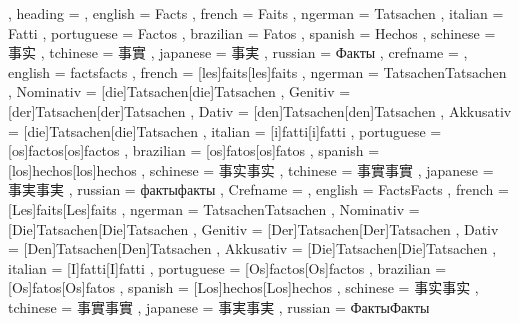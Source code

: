   {
    , heading =   {
                    , english     = Facts
                    , french      = Faits
                    , ngerman     = Tatsachen
                    , italian     = Fatti
                    , portuguese  = Factos
                    , brazilian   = Fatos
                    , spanish     = Hechos
                    , schinese    = 事实
                    , tchinese    = 事實
                    , japanese    = 事実
                    , russian     = Факты
                  }
    , crefname =  {
                    , english     = {facts}{facts}
                    , french      = [les]{faits}[les]{faits}
                    , ngerman     = { {Tatsachen}{Tatsachen}
                                      , Nominativ = [die]{Tatsachen}[die]{Tatsachen}
                                      , Genitiv   = [der]{Tatsachen}[der]{Tatsachen}
                                      , Dativ     = [den]{Tatsachen}[den]{Tatsachen}
                                      , Akkusativ = [die]{Tatsachen}[die]{Tatsachen}
                                    }
                    , italian     = [i]{fatti}[i]{fatti}
                    , portuguese  = [os]{factos}[os]{factos}
                    , brazilian   = [os]{fatos}[os]{fatos}
                    , spanish     = [los]{hechos}[los]{hechos}
                    , schinese    = {事实}{事实}
                    , tchinese    = {事實}{事實}
                    , japanese    = {事実}{事実}
                    , russian     = {факты}{факты}
                  }
    , Crefname =  {
                    , english     = {Facts}{Facts}
                    , french      = [Les]{faits}[Les]{faits}
                    , ngerman     = { {Tatsachen}{Tatsachen}
                                      , Nominativ = [Die]{Tatsachen}[Die]{Tatsachen}
                                      , Genitiv   = [Der]{Tatsachen}[Der]{Tatsachen}
                                      , Dativ     = [Den]{Tatsachen}[Den]{Tatsachen}
                                      , Akkusativ = [Die]{Tatsachen}[Die]{Tatsachen}
                                    }
                    , italian     = [I]{fatti}[I]{fatti}
                    , portuguese  = [Os]{factos}[Os]{factos}
                    , brazilian   = [Os]{fatos}[Os]{fatos}
                    , spanish     = [Los]{hechos}[Los]{hechos}
                    , schinese    = {事实}{事实}
                    , tchinese    = {事實}{事實}
                    , japanese    = {事実}{事実}
                    , russian     = {Факты}{Факты}
                  }
  }

